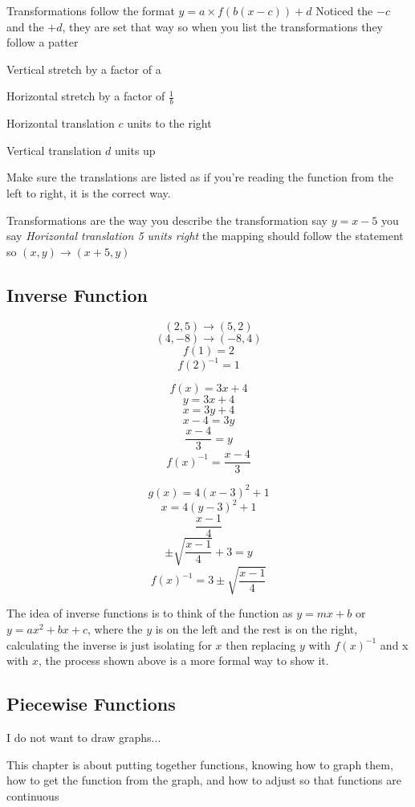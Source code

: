 \documentclass[../main.tex]{subfiles}
\begin{document}
Transformations follow the format $y=a\times f(b(x-c))+d$ Noticed the $-c$ and the $+d$, they are set that way so when you list the transformations they follow a patter

Vertical stretch by a factor of a

Horizontal stretch by a factor of $\frac{1}{b}$

Horizontal translation $c$ units to the right

Vertical translation $d$ units up

Make sure the translations are listed as if you're reading the function from the left to right, it is the correct way.

Transformations are the way you describe the transformation say $y=x-5$ you say \textit{Horizontal translation 5 units right} the mapping should follow the statement so $(x,y)\rightarrow(x+5,y)$
\subsection{Inverse Function}
\begin{center}
    $$(2,5)\rightarrow(5,2)$$
    $$(4,-8)\rightarrow(-8,4)$$
    $$f(1)=2$$
    $$f(2)^{-1}=1$$
\end{center}
\quad
\begin{center}
    $$f(x)=3x+4$$
    $$y=3x+4$$
    $$x=3y+4$$
    $$x-4=3y$$
    $$\frac{x-4}{3}=y$$
    $$f(x)^{-1}=\frac{x-4}{3}$$
\end{center}
\quad
\begin{center}
    $$g(x)=4(x-3)^2+1$$
    $$x=4(y-3)^2+1$$
    $$\frac{x-1}{4}$$
    $$\pm\sqrt{\frac{x-1}{4}}+3=y$$
    $$f(x)^{-1}=3\pm\sqrt{\frac{x-1}{4}}$$
\end{center}

The idea of inverse functions is to think of the function as $y=mx+b$ or $y=ax^2+bx+c$, where the $y$ is on the left and the rest is on the right, calculating the inverse is just isolating for $x$ then replacing $y$ with $f(x)^{-1}$ and x with $x$, the process shown above is a more formal way to show it.
\subsection{Piecewise Functions}

I do not want to draw graphs...

This chapter is about putting together functions, knowing how to graph them, how to get the function from the graph, and how to adjust so that functions are continuous
\end{document}
